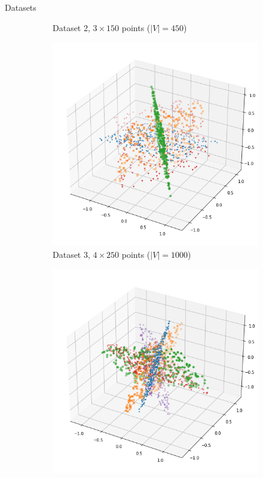 \documentclass[10pt]{beamer}
\begin{document}
\begin{frame}{Datasets}
\begin{figure}
\begin{subfigure}{0.23\textwidth}
            \caption{Dataset 2, $3 \times 150$ points ($|V|=450$)}
        \end{subfigure}%
        \hspace{0.2em}
        \begin{subfigure}{0.23\textwidth}
            \centering
            \includegraphics[width=\textwidth]{pics/ds3.png}
            \caption{Dataset 3, $4 \times 250$ points ($|V|=1000$)}
        \end{subfigure}%
        \hspace{0.2em}
        \begin{subfigure}{0.23\textwidth}
            \centering
            \includegraphics[width=\textwidth]{pics/ds4.png}

\end{subfigure}
\end{figure}
\end{frame}
\end{document}
